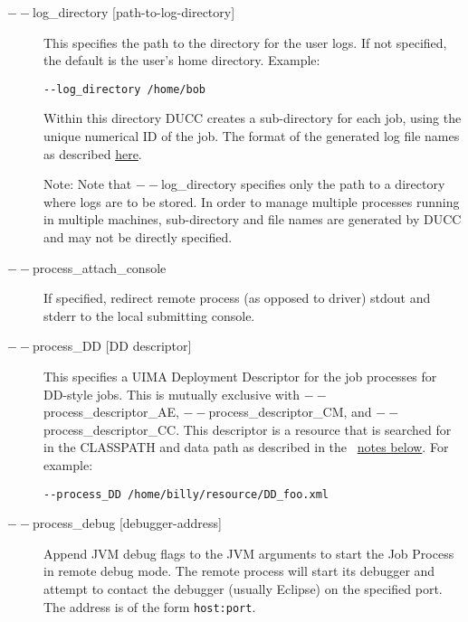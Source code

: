 \begin{description}
           \item[$--$log\_directory {[path-to-log-directory]} ]

             This specifies the path to the directory for the user logs. If not specified, the default is the 
             user's home directory. Example: 
             \begin{verbatim}
--log_directory /home/bob 
             \end{verbatim}
             
             Within this directory DUCC creates a sub-directory for each job, using the unique numerical 
             ID of the job. The format of the generated log file names as described
             \hyperref[chap:job-logs]{here}.
             
             Note: Note that $--$log\_directory specifies only the path to a directory where 
             logs are to be stored. In order to manage multiple processes running in multiple 
             machines, sub-directory and file names are generated by DUCC and may 
             not be directly specified. 

           \item[$--$process\_attach\_console] If specified, redirect remote process (as
             opposed to driver) stdout and stderr to the local submitting console.
             
           \item[$--$process\_DD {[DD descriptor]}  ]

             This specifies a UIMA Deployment Descriptor for the job processes for DD-style jobs. 
             This is mutually exclusive with $--$process\_descriptor\_AE, $--$process\_descriptor\_CM, 
             and $--$process\_descriptor\_CC. This descriptor is a resource that is searched for in the 
             CLASSPATH and data path as described in the ~\hyperref[par:cli.submit.notes]{notes below}.
             For example:
             \begin{verbatim}
--process_DD /home/billy/resource/DD_foo.xml 
             \end{verbatim}

           \item[$--$process\_debug {[debugger-address]}] Append JVM debug flags to the JVM
             arguments to start the Job Process in remote debug mode.  The remote process will start
             its debugger and attempt to contact the debugger (usually Eclipse) on the specified
             port.  The address is of the form {\tt host:port}.
             

\end{description}
